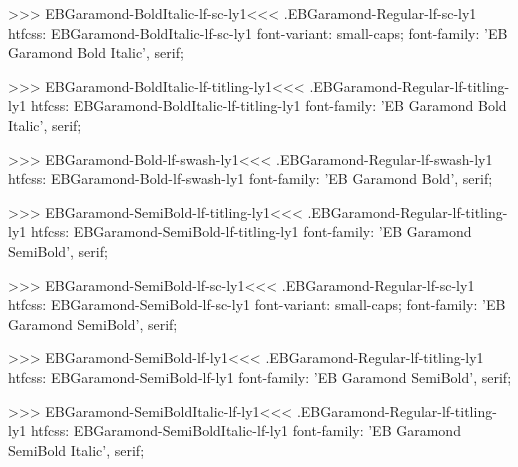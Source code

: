{{>>>
\<EBGaramond-BoldItalic-lf-sc-ly1\><<<
.EBGaramond-Regular-lf-sc-ly1
htfcss:  EBGaramond-BoldItalic-lf-sc-ly1  font-variant: small-caps; font-family: 'EB Garamond Bold Italic', serif;

>>>
\<EBGaramond-BoldItalic-lf-titling-ly1\><<<
.EBGaramond-Regular-lf-titling-ly1
htfcss:  EBGaramond-BoldItalic-lf-titling-ly1  font-family: 'EB Garamond Bold Italic', serif;

>>>
\<EBGaramond-Bold-lf-swash-ly1\><<<
.EBGaramond-Regular-lf-swash-ly1
htfcss:  EBGaramond-Bold-lf-swash-ly1  font-family: 'EB Garamond Bold', serif;

>>>
\<EBGaramond-SemiBold-lf-titling-ly1\><<<
.EBGaramond-Regular-lf-titling-ly1
htfcss:  EBGaramond-SemiBold-lf-titling-ly1  font-family: 'EB Garamond SemiBold', serif;

>>>
\<EBGaramond-SemiBold-lf-sc-ly1\><<<
.EBGaramond-Regular-lf-sc-ly1
htfcss:  EBGaramond-SemiBold-lf-sc-ly1  font-variant: small-caps; font-family: 'EB Garamond SemiBold', serif;

>>>
\<EBGaramond-SemiBold-lf-ly1\><<<
.EBGaramond-Regular-lf-titling-ly1
htfcss:  EBGaramond-SemiBold-lf-ly1  font-family: 'EB Garamond SemiBold', serif;

>>>
\<EBGaramond-SemiBoldItalic-lf-ly1\><<<
.EBGaramond-Regular-lf-titling-ly1
htfcss:  EBGaramond-SemiBoldItalic-lf-ly1  font-family: 'EB Garamond SemiBold Italic', serif;

}}
